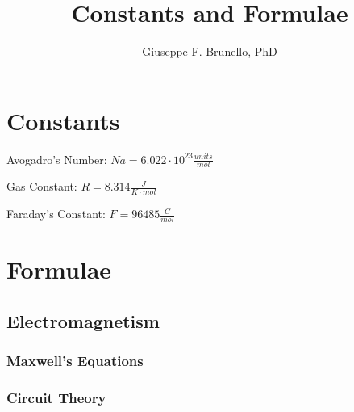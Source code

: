 \documentclass[]{article}
\title{Constants and Formulae}
\author{Giuseppe F. Brunello, PhD}
\begin{document}
\maketitle

\section{Constants}


Avogadro's Number: $Na = 6.022 \cdot 10^{23} \frac{units}{mol}$

Gas Constant: $R = 8.314 \frac{J}{K\cdot mol}$

Faraday's Constant: $F = 96485 \frac{C}{mol}$

\section{Formulae}

\subsection{Electromagnetism}

\subsubsection{Maxwell's Equations}

\subsubsection{Circuit Theory}
\end{document}
